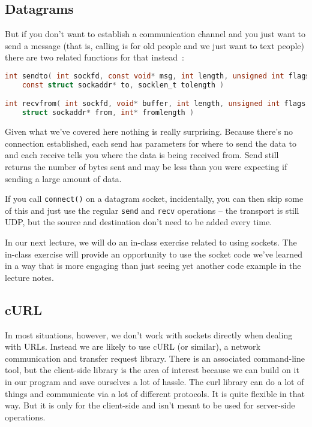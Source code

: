 \subsection*{Datagrams}
But if you don't want to establish a communication channel and you just want to send a message (that is, calling is for old people and we just want to text people) there are two related functions for that instead~\cite{getaddrinfo}:

\begin{lstlisting}[language=C]
int sendto( int sockfd, const void* msg, int length, unsigned int flags, 
    const struct sockaddr* to, socklen_t tolength )

int recvfrom( int sockfd, void* buffer, int length, unsigned int flags, 
    struct sockaddr* from, int* fromlength )
\end{lstlisting}

Given what we've covered here nothing is really surprising. Because there's no connection  established, each send has parameters for where to send the data to and each receive tells you where the data is being received from. Send still returns the number of bytes sent and may be less than you were expecting if sending a large amount of data.

If you call \texttt{connect()} on a datagram socket, incidentally, you can then skip some of this and just use the regular \texttt{send} and \texttt{recv} operations -- the transport is still UDP, but the source and destination don't need to be added every time.

In our next lecture, we will do an in-class exercise related to using sockets. The in-class exercise will provide an opportunity to use the socket code we've learned in a way that is more engaging than just seeing yet another code example in the lecture notes.


\subsection*{cURL}
In most situations, however, we don't work with sockets directly when dealing with URLs. Instead we are likely to use cURL (or similar), a network communication and transfer request library. There is an associated command-line tool, but the client-side library is the area of interest because we can build on it in our program and save ourselves a lot of hassle. The curl library can do a lot of things and communicate via a lot of different protocols. It is quite flexible in that way. But it is only for the client-side and isn't meant to be used for server-side operations.


